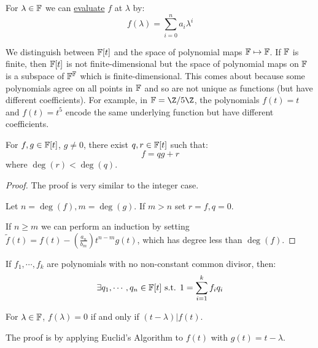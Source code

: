 \documentclass[../Main.tex]{subfiles}
\begin{document}
For $\lambda \in \mathbb{F}$ we can \underline{evaluate} $f$ at $\lambda$ by:
\begin{equation*}
    f(\lambda) = \sum_{i=0}^{n} a_i \lambda^i
\end{equation*}
\begin{warning}
    We distinguish between $\mathbb{F}[t]$ and the space of polynomial maps $\mathbb{F} \mapsto \mathbb{F}$. If $\mathbb{F}$ is finite, then $\mathbb{F}[t]$ is not finite-dimensional but the space of polynomial maps on $\mathbb{F}$ is a subspace of $\mathbb{F}^{\mathbb{F}}$ which is finite-dimensional. This comes about because some polynomials agree on all points in $\mathbb{F}$ and so are not unique as functions (but have different coefficients). For example, in $\F = \Z / 5\Z$, the polynomials $f(t) = t$ and $f(t) = t^5$ encode the same underlying function but have different coefficients.
\end{warning}
\begin{proposition}
    For $f, g \in \mathbb{F}[t]$, $g \neq 0$, there exist $q, r \in \mathbb{F}[t]$ such that:
    \begin{equation*}
        f = qg + r
    \end{equation*}
    where $\deg(r) < \deg(q)$.
    \label{propEuclidAlgPoly}
\end{proposition}
\begin{proof}
    The proof is very similar to the integer case.

    Let $n = \deg(f), m = \deg(g)$. If $m > n$ set $r = f, q = 0$.

    If $n \geq m$ we can perform an induction by setting $\tilde{f}(t) = f(t) - \left(\frac{a_n}{b_m}\right)t^{n-m} g(t)$, which has degree less than $\deg(f)$.
\end{proof}
\begin{corollary}
    If $f_1, \cdots, f_k$ are polynomials with no non-constant common divisor, then:
    \begin{equation*}
        \exists q_1, \cdots, q_n \in \mathbb{F}[t] \text{ s.t. } 1 = \sum_{i=1}^{k} f_i q_i
    \end{equation*}
    \label{corBezoutPolynom}
\end{corollary}
\begin{lemma}
    For $\lambda \in \mathbb{F}$, $f(\lambda) = 0$ if and only if $(t - \lambda) | f(t)$.
    \label{lemFactorTheorem}
\end{lemma}
The proof is by applying Euclid's Algorithm to $f(t)$ with $g(t) = t - \lambda$.
\end{document}
